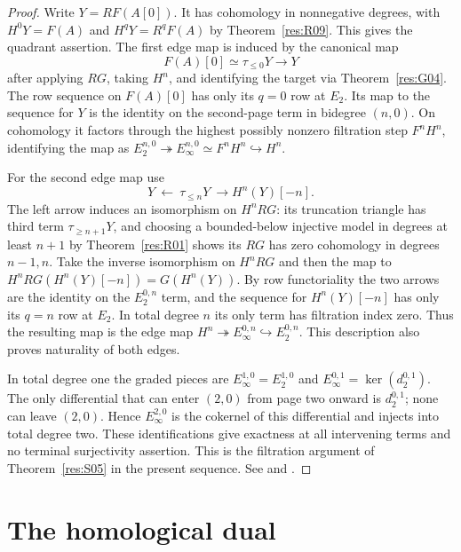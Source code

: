 \begin{proof}
Write \(Y=RF(A[0])\). It has cohomology in nonnegative degrees,
with \(H^0Y=F(A)\) and \(H^qY=R^qF(A)\) by
Theorem~\ref{res:R09}. This gives the quadrant assertion.
The first edge map is induced by the canonical map
\[
       F(A)[0]\simeq\tau_{\le0}Y\longrightarrow Y
\]
after applying \(RG\), taking \(H^n\), and identifying the
target via Theorem~\ref{res:G04}. The row sequence on \(F(A)[0]\)
has only its \(q=0\) row at \(E_2\). Its map to the sequence for
\(Y\) is the identity on the second-page term in bidegree
\((n,0)\). On cohomology it factors through the highest possibly
nonzero filtration step \(F^nH^n\), identifying the map as
\(E_2^{n,0}\twoheadrightarrow E_\infty^{n,0}
  \simeq F^nH^n\hookrightarrow H^n\).

For the second edge map use
\[
      Y\ \longleftarrow\ \tau_{\le n}Y\
               \longrightarrow H^n(Y)[-n].
\]
The left arrow induces an isomorphism on \(H^nRG\): its
truncation triangle has third term \(\tau_{\ge n+1}Y\), and
choosing a bounded-below injective model in degrees at least
\(n+1\) by Theorem~\ref{res:R01} shows its \(RG\) has zero cohomology
in degrees \(n-1,n\). Take the inverse isomorphism on
\(H^nRG\) and then the map to
\(H^nRG(H^n(Y)[-n])=G(H^n(Y))\).
By row functoriality the two arrows are the identity on the
\(E_2^{0,n}\) term, and the sequence for \(H^n(Y)[-n]\) has
only its \(q=n\) row at \(E_2\). In total degree \(n\) its
only term has filtration index zero. Thus the resulting map
is the edge map
\(H^n\twoheadrightarrow E_\infty^{0,n}\hookrightarrow E_2^{0,n}\).
This description also proves naturality of both edges.

In total degree one the graded pieces are
\(E_\infty^{1,0}=E_2^{1,0}\) and
\(E_\infty^{0,1}=\ker(d_2^{0,1})\). The only differential
that can enter \((2,0)\) from page two onward is \(d_2^{0,1}\);
none can leave \((2,0)\). Hence \(E_\infty^{2,0}\) is the
cokernel of this differential and injects into total degree two.
These identifications give exactness at all intervening terms
and no terminal surjectivity assertion. This is the filtration
argument of Theorem~\ref{res:S05} in the present sequence.
See \cite[Tag 015N]{stacks-derived} and
\cite[Theorem 5.8.3]{weibel}.
\end{proof}

\section{The homological dual}

